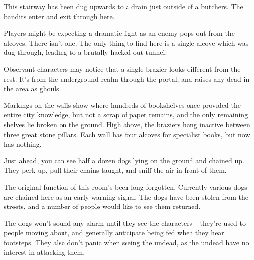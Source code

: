 \label{sewer_map}

\begin{multicols}{2}

\label{butcher_exit}

This stairway has been dug upwards to a drain just outside of a butchers.
The bandits enter and exit through here.

\label{oldlibrary}

Players might be expecting a dramatic fight as an enemy pops out from the alcoves.  There isn't one.  The only thing to find here is a single alcove which was dug through, leading to a brutally hacked-out tunnel.

Observant characters may notice that a single brazier looks different from the rest.  It's from the underground realm through the portal, and raises any dead in the area as ghouls.

\begin{boxtext}

	Markings on the walls show where hundreds of bookshelves once provided the entire city knowledge, but not a scrap of paper remains, and the only remaining shelves lie broken on the ground.  High above, the braziers hang inactive between three great stone pillars.  Each wall has four alcoves for specialist books, but now has nothing.

\end{boxtext}


\begin{boxtext}

	Just ahead, you can see half a dozen dogs lying on the ground and chained up.  They perk up, pull their chains taught, and sniff the air in front of them.

\end{boxtext}

The original function of this room's been long forgotten.  Currently various dogs are chained here as an early warning signal.  The dogs have been stolen from the streets, and a number of people would like to see them returned.

The dogs won't sound any alarm until they see the characters -- they're used to people moving about, and generally anticipate being fed when they hear footsteps.  They also don't panic when seeing the undead, as the undead have no interest in attacking them.


\end{multicols}
